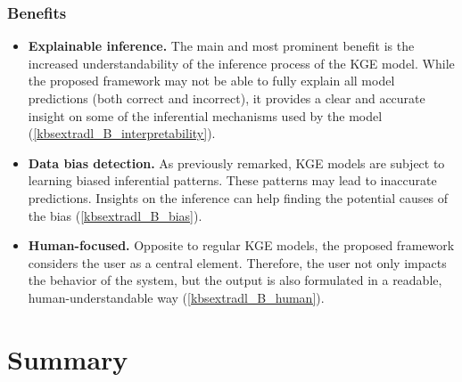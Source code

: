 \subsubsection*{Benefits}
\begin{itemize}
    \item \textbf{Explainable inference.} The main and most prominent benefit is the increased understandability of the inference process of the KGE model. While the proposed framework may not be able to fully explain all model predictions (both correct and incorrect), it provides a clear and accurate insight on some of the inferential mechanisms used by the model (\ref{kbsextradl_B_interpretability}).
    
    \item \textbf{Data bias detection.} As previously remarked, KGE models are subject to learning biased inferential patterns. These patterns may lead to inaccurate predictions. Insights on the inference can help finding the potential causes of the bias (\ref{kbsextradl_B_bias}).   
    
    \item \textbf{Human-focused.} Opposite to regular KGE models, the proposed framework considers the user as a central element. Therefore, the user not only impacts the behavior of the system, but the output is also formulated in a readable, human-understandable way (\ref{kbsextradl_B_human}). 
\end{itemize}


\section{Summary}\label{6_sec:summary}